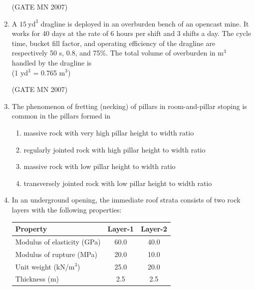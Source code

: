 \documentclass[journal]{IEEEtran}
\begin{document}
\begin{enumerate}
\hfill (GATE MN 2007)

\item A $15 \ \text{yd}^3$ dragline is deployed in an overburden bench of an opencast mine. It works for 40 days at the rate of 6 hours per shift and 3 shifts a day. The cycle time, bucket fill factor, and operating efficiency of the dragline are respectively 50 s, 0.8, and 75\%. The total volume of overburden in m$^3$ handled by the dragline is \\
(1 yd$^3$ = 0.765 m$^3$)


\begin{enumerate}
\end{enumerate}

\hfill (GATE MN 2007)


\item The phenomenon of fretting (necking) of pillars in room-and-pillar stoping is common in the pillars formed in
\begin{enumerate}
\item massive rock with very high pillar height to width ratio
\item regularly jointed rock with high pillar height to width ratio
\item massive rock with low pillar height to width ratio
\item transversely jointed rock with low pillar height to width ratio
\end{enumerate}
\item In an underground opening, the immediate roof strata consists of two rock layers with the following properties:

\begin{center}
\begin{tabular}{|l|c|c|}
\hline
Property & Layer-1 & Layer-2 \\
\hline
Modulus of elasticity (GPa) & 60.0 & 40.0 \\
\hline
Modulus of rupture (MPa) & 20.0 & 10.0 \\
\hline
Unit weight (kN/m$^3$) & 25.0 & 20.0 \\
\hline
Thickness (m) & 2.5 & 2.5 \\
\hline
\end{tabular}
\end{center}


\end{enumerate}
\end{document}
